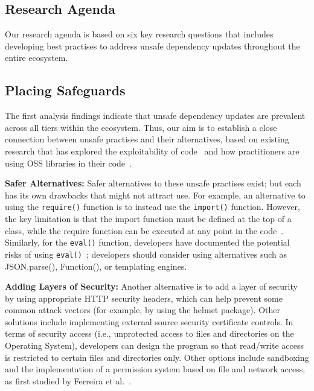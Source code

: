 \documentclass[sigconf,screen]{acmart}
\begin{document}
\begin{sloppy}
\section{Research Agenda}

Our research agenda is based on six key research questions that includes developing best practises to address unsafe dependency updates throughout the entire ecosystem.

\subsection{\textbf{Placing Safeguards}}
The first analysis findings indicate that unsafe dependency updates are prevalent across all tiers within the ecosystem. Thus, our aim is to establish a close connection between unsafe practises and their alternatives, based on existing research that has explored the exploitability of code~\citep{kang:issta2022} and how practitioners are using OSS libraries in their code~\citep{cispa3932}.


\textbf{Safer Alternatives:} Safer alternatives to these unsafe practises exist; but each has its own drawbacks that might not attract use. For example, an alternative to using the \texttt{require()} function is to instead use the \texttt{import()} function.
However, the key limitation is that the import function must be defined at the top of a class, while the require function can be executed at any point in the code~\citep{JavaScri86:online}. 
Similarly, for the \texttt{eval()} function, developers have documented the potential risks of using \texttt{eval()}~\citep{JavaScri60:online}; developers should consider using alternatives such as JSON.parse(), Function(), or templating engines.

\textbf{Adding Layers of Security:}
Another alternative is to add a layer of security by using appropriate HTTP security headers, which can help prevent some common attack vectors (for example, by using the helmet package).
Other solutions include implementing external source security certificate controls.
In terms of security access (i.e., unprotected access to files and directories on the Operating System), developers can design the program so that read/write access is restricted to certain files and directories only. Other options include sandboxing and the implementation of a permission system based on file and network access, as first studied by Ferreira et al.~\citep{Ferreira:icse2021}.


\end{sloppy}
\end{document}
